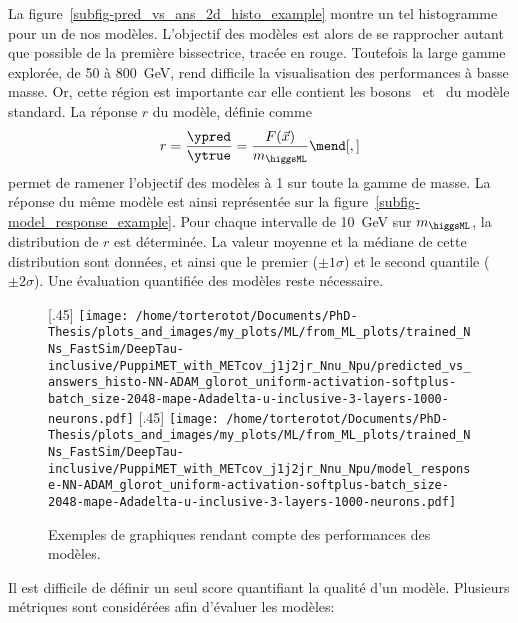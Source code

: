 La figure~\ref{subfig-pred_vs_ans_2d_histo_example} montre un tel histogramme pour un de nos modèles.
L'objectif des modèles est alors de se rapprocher autant que possible de la première bissectrice, tracée en rouge.
Toutefois
la large gamme explorée, de \num{50} à \SI{800}{\GeV}, rend difficile
la visualisation des performances à basse masse.
Or, cette région est importante car elle contient les bosons \Zboson\ et \higgs\ du modèle standard.
La réponse $r$ du modèle, définie comme
\begin{equation}
r = \frac{\ypred}{\ytrue} = \frac{F(\vec{x})}{m_{\higgsML}}
\mend[,]
\end{equation}
permet de ramener l'objectif des modèles à 1 sur toute la gamme de masse.
La réponse du même modèle est ainsi représentée sur la figure~\ref{subfig-model_response_example}.
Pour chaque intervalle de \SI{10}{\GeV} sur $m_{\higgsML}$,
la distribution de $r$ est déterminée.
La valeur moyenne et la médiane de cette distribution sont données,
et ainsi que le premier ($\pm1\sigma$) et le second quantile ($\pm2\sigma$).
Une évaluation quantifiée des modèles reste nécessaire.
\begin{figure}[h]
\centering

[.45\textwidth]
{\texttt{[image: /home/torterotot/Documents/PhD-Thesis/plots\_and\_images/my\_plots/ML/from\_ML\_plots/trained\_NNs\_FastSim/DeepTau-inclusive/PuppiMET\_with\_METcov\_j1j2jr\_Nnu\_Npu/predicted\_vs\_answers\_histo-NN-ADAM\_glorot\_uniform-activation-softplus-batch\_size-2048-mape-Adadelta-u-inclusive-3-layers-1000-neurons.pdf]}}
\hfill
{}[.45\textwidth]
{\texttt{[image: /home/torterotot/Documents/PhD-Thesis/plots\_and\_images/my\_plots/ML/from\_ML\_plots/trained\_NNs\_FastSim/DeepTau-inclusive/PuppiMET\_with\_METcov\_j1j2jr\_Nnu\_Npu/model\_response-NN-ADAM\_glorot\_uniform-activation-softplus-batch\_size-2048-mape-Adadelta-u-inclusive-3-layers-1000-neurons.pdf]}}

\caption{Exemples de graphiques rendant compte des performances des modèles.}
\label{fig-model_perfs_graphiques_examples}
\end{figure}
\par
Il est difficile de définir un seul score quantifiant la qualité d'un modèle.
Plusieurs métriques sont considérées afin d'évaluer les modèles:
